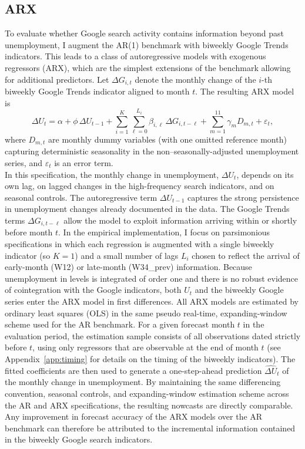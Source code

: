 \documentclass[12pt,a4paper]{article}
\begin{document}
\subsection{ARX}
To evaluate whether Google search activity contains information beyond past unemployment, 
I augment the AR(1) benchmark with biweekly Google Trends indicators. 
This leads to a class of autoregressive models with exogenous regressors (ARX), which are the simplest extensions of the benchmark allowing for additional predictors.
Let $\Delta G_{i,t}$ denote the monthly change of the $i$-th biweekly Google Trends indicator aligned to month $t$. The resulting ARX model is
\begin{equation}
    \Delta U_t 
    = \alpha 
    + \phi \,\Delta U_{t-1}
    + \sum_{i=1}^{K} \sum_{\ell=0}^{L_i} \beta_{i,\ell} \,\Delta G_{i,t-\ell} 
    + \sum_{m=1}^{11} \gamma_m D_{m,t}
    + \varepsilon_t,
    \label{eq:arx_main}
\end{equation}
where $D_{m,t}$ are monthly dummy variables (with one omitted reference month) capturing deterministic seasonality in the non–seasonally-adjusted unemployment series, and $\varepsilon_t$ is an error term.\\
In this specification, the monthly change in unemployment, $\Delta U_t$, depends on its own lag, on lagged changes in the high-frequency search indicators, and on seasonal controls. The autoregressive term $\Delta U_{t-1}$ captures the strong persistence in unemployment changes already documented in the data. The Google Trends terms $\Delta G_{i,t-\ell}$ allow the model to exploit information arriving within or shortly before month $t$. In the empirical implementation, I focus on parsimonious specifications in which each regression is augmented with a single biweekly indicator (so $K=1$) and a small number of lags $L_i$ chosen to reflect the arrival of early-month (W12) or late-month (W34\_prev) information. 
Because unemployment in levels is integrated of order one and there is no robust evidence of cointegration with the Google indicators, both $U_t$ and the biweekly Google series enter the ARX model in first differences. 
All ARX models are estimated by ordinary least squares (OLS) in the same pseudo real-time, expanding-window scheme used for the AR benchmark. For a given forecast month $t$ in the evaluation period, the estimation sample consists of all observations dated strictly before $t$, using only regressors that are observable at the end of month $t$ (see Appendix~\ref{app:timing} for details on the timing of the biweekly indicators). The fitted coefficients are then used to generate a one-step-ahead prediction $\widehat{\Delta U}_t$ of the monthly change in unemployment.
By maintaining the same differencing convention, seasonal controls, and expanding-window estimation scheme across the AR and ARX specifications, the resulting nowcasts are directly comparable. Any improvement in forecast accuracy of the ARX models over the AR benchmark can therefore be attributed to the incremental information contained in the biweekly Google search indicators.
\end{document}
